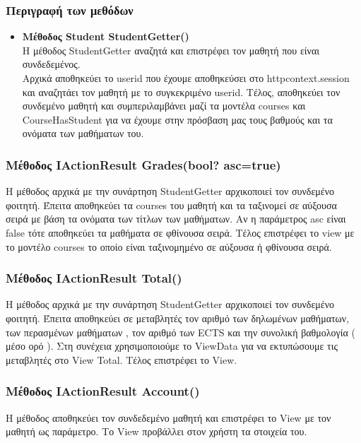 \documentclass[12pt]{article}
\begin{document}
	\subsubsection{Περιγραφή των μεθόδων}
	
	\begin{itemize}
		\item \textbf{Μέθοδος Student StudentGetter()}\\		
		Η μέθοδος StudentGetter αναζητά και επιστρέφει τον μαθητή που είναι συνδεδεμένος.\\
		Αρχικά αποθηκεύει το userid που έχουμε αποθηκεύσει στο httpcontext.session και αναζητάει τον μαθητή με το συγκεκριμένο userid. Τέλος, αποθηκεύει τον συνδεμένο μαθητή και συμπεριλαμβάνει μαζί τα μοντέλα courses και CourseHasStudent για να έχουμε στην πρόσβαση μας τους βαθμούς και τα ονόματα των μαθήματων του.

	\end{itemize}


	
	\subsubsection{Μέθοδος IActionResult Grades(bool? asc=true)}
	Η μέθοδος αρχικά με την συνάρτηση StudentGetter αρχικοποιεί τον συνδεμένο φοιτητή. Έπειτα αποθηκεύει τα courses του μαθητή και τα ταξινομεί σε αύξουσα σειρά με βάση τα ονόματα των τίτλων των μαθήματων. Αν η παράμετρος asc είναι false τότε αποθηκεύει τα μαθήματα σε φθίνουσα σειρά. Τέλος επιστρέφει το view με το μοντέλο courses το οποίο είναι ταξινομημένο σε αύξουσα ή φθίνουσα σειρά.
	
	\subsubsection{Μέθοδος IActionResult Total()}
	Η μέθοδος αρχικά με την συνάρτηση StudentGetter αρχικοποιεί τον συνδεμένο φοιτητή. Έπειτα αποθηκεύει σε μεταβλητές τον αριθμό των δηλωμένων μαθήματων, των περασμένων μαθήματων , τον αριθμό των ECTS και την συνολική βαθμολογία ( μέσο ορό ). Στη συνέχεια χρησιμοποιούμε το ViewData για να εκτυπώσουμε τις μεταβλητές στο View Total. Τέλος επιστρέφει το View.
	
	\subsubsection{Μέθοδος IActionResult Account()}
	Η μέθοδος αποθηκεύει τον συνδεδεμένο μαθητή και επιστρέφει το View με τον μαθητή ως παράμετρο. Το View προβάλλει στον χρήστη τα στοιχεία του.
	
\end{document}
